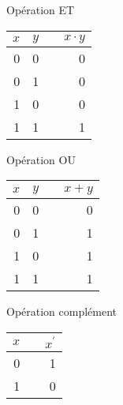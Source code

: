 \documentclass[presentation]{beamer}
\begin{document}
\begin{frame}[label={sec:org8678d16}]{Opération ET}
\begin{center}
\begin{tabular}{rrlr}
\(x\) & \(y\) &  & \(x \cdot y\)\\[0pt]
\hline
0 & 0 &  & 0\\[0pt]
0 & 1 &  & 0\\[0pt]
1 & 0 &  & 0\\[0pt]
1 & 1 &  & 1\\[0pt]
\end{tabular}
\end{center}
\end{frame}

\begin{frame}[label={sec:org0b2de98}]{Opération OU}
\begin{center}
\begin{tabular}{rrlr}
\(x\) & \(y\) &  & \(x + y\)\\[0pt]
\hline
0 & 0 &  & 0\\[0pt]
0 & 1 &  & 1\\[0pt]
1 & 0 &  & 1\\[0pt]
1 & 1 &  & 1\\[0pt]
\end{tabular}
\end{center}
\end{frame}

\begin{frame}[label={sec:org1c92b6a}]{Opération complément}
\begin{center}
\begin{tabular}{rlr}
\(x\) &  & \(x^{\prime}\)\\[0pt]
\hline
0 &  & 1\\[0pt]
1 &  & 0\\[0pt]
\end{tabular}
\end{center}
\end{frame}
\end{document}
